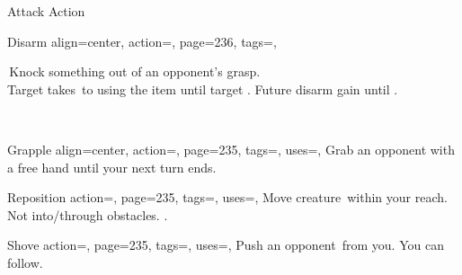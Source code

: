\begin{PageBack}
\begin{Tables}{\backTableHeight}
\begin{Table}{Attack Action}
            \begin{entry}{Disarm}{%
                align=center,
                action=,
                page=236,
                tags=\Attack,
            }
                \begin{minipage}{0.8\linewidth}
                    \AthleticsReflex[tags={T}] \dash\,Knock something out of an opponent's grasp.\\
                    Target takes \,\Cirm to using the item until target . Future disarm gain  \Cirm until .
                \end{minipage}\hfill
                \begin{minipage}{0.2\linewidth}
                    \raggedleft
                    \\
                \end{minipage}
            \end{entry}
            \begin{entry}{Grapple}{%
                align=center,
                action=,
                page=235,
                tags=\Attack,
                uses=\AthleticsFortitude,
            }
                Grab an opponent with a free hand until your next turn ends. \hfill{}\\
                \hspace{10.5ex}\hfill
            \end{entry}
            \begin{entry}{Reposition}{%
                action=,
                page=235,
                tags=\Attack,
                uses=\AthleticsFortitude,
            }
                Move creature \,\Feet within your reach. Not into/through obstacles.\hfill
                .
            \end{entry}
            \begin{entry}{Shove}{%
                action=,
                page=235,
                tags=\Attack,
                uses=\AthleticsFortitude,
            }
                Push an opponent \,\Feet from you. You can follow. \hfill

\end{entry}
\end{Table}
\end{Tables}
\end{PageBack}
